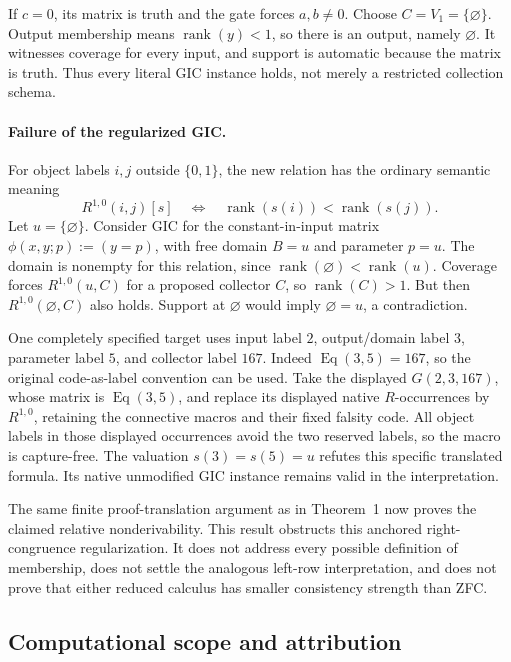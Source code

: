 If $c=0$, its matrix is truth and the gate forces $a,b\ne0$.
Choose $C=V_1=\{\varnothing\}$. Output membership means
$\operatorname{rank}(y)<1$, so there is an output, namely
$\varnothing$. It witnesses coverage for every input, and support is
automatic because the matrix is truth. Thus every literal GIC instance
holds, not merely a restricted collection schema.

\paragraph{Failure of the regularized GIC.}
For object labels $i,j$ outside $\{0,1\}$, the new relation has the
ordinary semantic meaning
\[
 R^{1,0}(i,j)[s]\quad\Longleftrightarrow\quad
         \operatorname{rank}(s(i))<\operatorname{rank}(s(j)).
\]
Let $u=\{\varnothing\}$. Consider GIC for the constant-in-input matrix
$\phi(x,y;p):=(y=p)$, with free domain $B=u$ and parameter $p=u$.
The domain is nonempty for this relation, since
$\operatorname{rank}(\varnothing)<\operatorname{rank}(u)$.
Coverage forces $R^{1,0}(u,C)$ for a proposed collector $C$, so
$\operatorname{rank}(C)>1$. But then $R^{1,0}(\varnothing,C)$ also
holds. Support at $\varnothing$ would imply $\varnothing=u$, a
contradiction.

One completely specified target uses input label $2$, output/domain
label $3$, parameter label $5$, and collector label $167$. Indeed
$\operatorname{Eq}(3,5)=167$, so the original code-as-label convention
can be used. Take the displayed $G(2,3,167)$, whose matrix is
$\operatorname{Eq}(3,5)$, and replace its displayed native $R$-occurrences by $R^{1,0}$, retaining
the connective macros and their fixed falsity code. All object labels in
those displayed occurrences avoid the two reserved labels,
so the macro is capture-free. The valuation $s(3)=s(5)=u$ refutes this
specific translated formula. Its native unmodified GIC instance remains
valid in the interpretation.

The same finite proof-translation argument as in Theorem~1 now proves
the claimed relative nonderivability. This result obstructs this anchored
right-congruence regularization. It does not address every possible
definition of membership, does not settle the analogous left-row
interpretation, and does not prove that either reduced calculus has
smaller consistency strength than ZFC.

\subsection{Computational scope and attribution}

